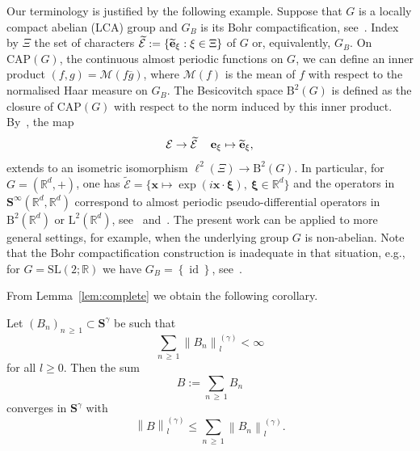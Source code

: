 \documentclass[AHL,Unicode,longabstracts,published]{cedram}
\DeclareMathOperator{\id}{id}
\newcommand{\RB}{\mathrm{B}}
\newcommand{\CAP}{\mathrm{CAP}}
\renewcommand{\mathsf}{\mathrm}
\newcommand{\sfB}{\mathsf{B}}
\newcommand{\sfL}{\mathsf{L}}
\newcommand{\R}{\mathbb R}
\newcommand{\CE}{\mathcal{E}}
\newcommand{\CM}{\mathcal{M}}
\newcommand{\bxi}{\boldsymbol \xi}
\newcommand{\BS}{\mathbf S}
\newcommand{\bx}{\mathbf x}
\newcommand{\be}{\mathbf e}
\newcommand{\set}[1]{\left\{ #1 \right\}}
\newcommand{\snorm}[3]{\left\| #1\right\|_{#3}^{(#2)}}
\let\oldtilde\tilde
\renewcommand*{\tilde}[1]{\mathchoice{\widetilde{#1}}{\widetilde{#1}}{\oldtilde{#1}}{\oldtilde{#1}}}
\begin{document}
\begin{rema}
Our terminology is justified by the following example. Suppose that $G$ is a locally compact abelian (LCA) group and $G_B$ is its Bohr compactification, see~\cite[\S 1]{Shubin1978}. Index by $\Xi$ the set of characters $\widetilde{\CE}:=\lbrace \tilde{\be}_\xi:\xi\in\Xi\rbrace$ of $G$ or, equivalently, $G_B$. On $\CAP(G)$, the continuous almost periodic functions on $G$, we can define an inner product $(f,g) = \CM(f\overline g)$, where $\CM(f)$ is the mean of $f$ with respect to the normalised Haar measure on $G_B$. The Besicovitch space $\RB^2(G)$ is defined as the closure of $\CAP(G)$ with respect to the norm induced by this inner product. By~\cite[Proposition~1.5]{Shubin1978}, the map
\begin{equation}
\CE\to\widetilde{\CE}\, \quad \be_\xi\mapsto\tilde{\be}_\xi,
\end{equation}
extends to an isometric isomorphism $\ell^2(\Xi)\to \sfB^2(G)$. In particular, for $G = (\R^d,+)$, one has $\widetilde{\CE}=\lbrace \bx\mapsto \exp(i \bx\cdot
\bxi),\ \bxi\in\R^d\rbrace$ and the operators in $\BS^\infty(\R^d,\R^d)$ correspond to almost periodic pseudo-differential operators in $\sfB^2(\R^d)$ or $\sfL^2(\R^d)$, see~\cite[\S 3--4]{Shubin1978} and~\cite[Equation (8.8)]{ParSht2012}. The present work can be applied to more general settings, for example, when the underlying group $G$ is non-abelian. Note that the Bohr compactification construction is inadequate in that situation, e.g., for $G = \mathrm{SL}(2;\R)$ we have $G_B = \set \id$, see~\cite[p.~4]{Shubin1978}.
\end{rema}


From Lemma~\ref{lem:complete} we obtain the following corollary.
\begin{coro}\label{cor:complete}
Let $(B_n)_{n\,\geq\,1} \subset \BS^\gamma$ be such that
\begin{equation}
\sum_{n\,\geq\,1}\snorm{B_n}{\gamma}{l}<\infty
\end{equation}
for all $l \geq 0$. Then the sum
\begin{equation}
B:=\sum_{n\,\geq\,1}B_n
\end{equation}
converges in $\BS^\gamma$ with
\begin{equation}
\snorm{B}{\gamma}{l}\leq\sum\limits_{n\,\geq\,1}\snorm{B_n}{\gamma}{l}.
\end{equation}
\end{coro}
\end{document}
